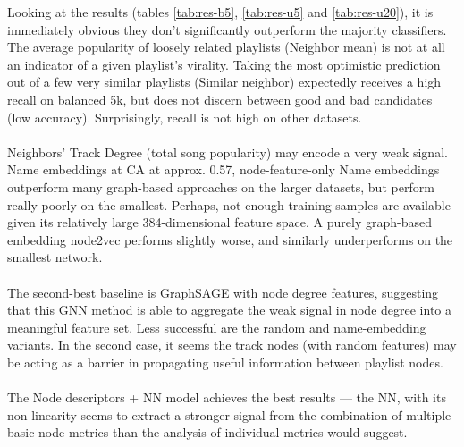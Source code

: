 \documentclass[9pt,twocolumn,twoside]{pnas-report}
\begin{document}
Looking at the results (tables \ref{tab:res-b5}, \ref{tab:res-u5} and \ref{tab:res-u20}), it is immediately obvious they don't significantly outperform the majority classifiers.
The average popularity of loosely related playlists (Neighbor mean) is not at all an indicator of a given playlist's virality. Taking the most optimistic prediction out of a few very similar playlists (Similar neighbor) expectedly receives a high recall on balanced 5k, but does not discern between good and bad candidates (low accuracy). Surprisingly, recall is not high on other datasets.
\paragraph{}
Neighbors' Track Degree (total song popularity) may encode a very weak signal. Name embeddings at CA at approx. 0.57, node-feature-only Name embeddings outperform many graph-based approaches on the larger datasets, but perform really poorly on the smallest. Perhaps, not enough training samples are available given its relatively large 384-dimensional feature space.
A purely graph-based embedding node2vec performs slightly worse, and similarly underperforms on the smallest network.

\paragraph{}
The second-best baseline is GraphSAGE with node degree features, suggesting that this GNN method is able to aggregate the weak signal in node degree into a meaningful feature set. Less successful are the random and name-embedding variants. In the second case, it seems the track nodes (with random features) may be acting as a barrier in propagating useful information between playlist nodes. 

\paragraph{}
The Node descriptors + NN model achieves the best results --- the NN, with its non-linearity seems to extract a stronger signal from the combination of multiple basic node metrics than the analysis of individual metrics would suggest.






\end{document}
